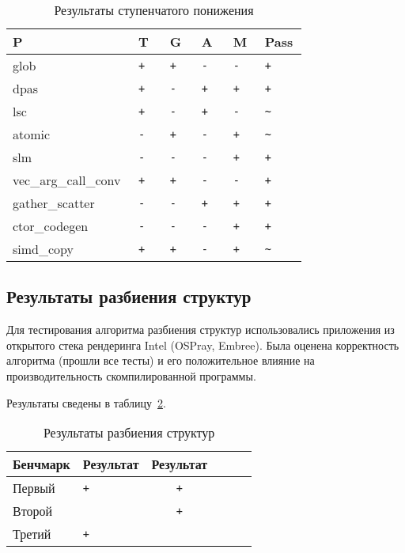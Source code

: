\begin{table}[!h]
    \centering
    \captionsetup{justification=centering}
    \caption{Результаты ступенчатого понижения}\label{tab:results/lowering}
    \begin{tabular}{|p{0.24\linewidth}|p{0.1\linewidth}|p{0.1\linewidth}|p{0.1\linewidth}|p{0.1\linewidth}|p{0.1\linewidth}|}
        \hline
        P & T & G & A & M & Pass \\ \hline        
        glob   & \verb|+| & \verb|+| & \verb|-| & \verb|-| & \verb|+| \\ \hline
        dpas   & \verb|+| & \verb|-| & \verb|+| & \verb|+| & \verb|+| \\ \hline
        lsc    & \verb|+| & \verb|-| & \verb|+| & \verb|-| & \verb|~| \\ \hline
        atomic & \verb|-| & \verb|+| & \verb|-| & \verb|+| & \verb|~| \\ \hline
        slm    & \verb|-| & \verb|-| & \verb|-| & \verb|+| & \verb|+| \\ \hline
        vec\_arg\_call\_conv & 
                 \verb|+| & \verb|+| & \verb|-| & \verb|-| & \verb|+| \\ \hline
        gather\_scatter    & 
                 \verb|-| & \verb|-| & \verb|+| & \verb|+| & \verb|+| \\ \hline
        ctor\_codegen      & 
                 \verb|-| & \verb|-| & \verb|-| & \verb|+| & \verb|+| \\ \hline
        simd\_copy & 
                 \verb|+| & \verb|+| & \verb|-| & \verb|+| & \verb|~| \\ \hline
    \end{tabular}
\end{table}

\subsection{Результаты разбиения структур}\label{subsec:results/results/splitter}

Для тестирования алгоритма разбиения структур использовались приложения из открытого стека рендеринга Intel (OSPray, Embree). Была оценена корректность алгоритма (прошли все тесты) и его положительное влияние на производительность скомпилированной программы.

Результаты сведены в таблицу~\cref{tab:results/splitter}.

\begin{table}
    \centering
    \captionsetup{justification=centering}
    \caption{Результаты разбиения структур}\label{tab:results/splitter}
    \begin{tabular}{llc|llc}
        \toprule
        Бенчмарк & Результат & Результат \\
        \midrule
        Первый   & \verb|+|  & \verb|+|  \\
        Второй   & \verb| |  & \verb|+|  \\
        Третий   & \verb|+|  & \verb| |  \\
        \bottomrule
    \end{tabular}
\end{table}

